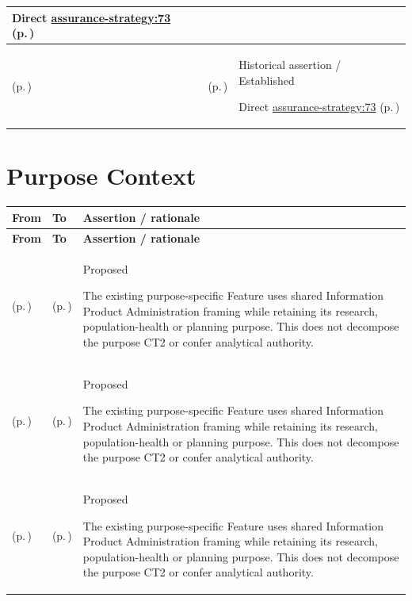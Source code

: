 \begin{longtable}{|>{\raggedright\arraybackslash}p{0.27\TableWidth}|>{\raggedright\arraybackslash}p{0.27\TableWidth}|>{\raggedright\arraybackslash}p{0.46\TableWidth}|}
Direct \hyperref[rad:assurance-strategy:58]{assurance-strategy:73} (p.\,\pageref{rad:assurance-strategy:58})\\\hline
\nameref{cap:bec-governed-assurance} (p.\,\pageref{cap:bec-governed-assurance}) & \nameref{cap:ec-14} (p.\,\pageref{cap:ec-14}) & Historical assertion / Established

Direct \hyperref[rad:assurance-strategy:58]{assurance-strategy:73} (p.\,\pageref{rad:assurance-strategy:58})\\\hline
\end{longtable}\endgroup
\section{Purpose Context}
\begingroup\small\setlength{\TableWidth}{\dimexpr\linewidth-6\tabcolsep-4\arrayrulewidth\relax}
\begin{longtable}{|>{\raggedright\arraybackslash}p{0.27\TableWidth}|>{\raggedright\arraybackslash}p{0.27\TableWidth}|>{\raggedright\arraybackslash}p{0.46\TableWidth}|}
\hline\rowcolor{TableHead}\textbf{From} & \textbf{To} & \textbf{Assertion / rationale}\\\hline\endfirsthead
\hline\rowcolor{TableHead}\textbf{From} & \textbf{To} & \textbf{Assertion / rationale}\\\hline\endhead
\hline\endfoot
\nameref{feature:authorised-research-release-assembly} (p.\,\pageref{feature:authorised-research-release-assembly}) & \nameref{cap:bec-authorised-research-information-provision} (p.\,\pageref{cap:bec-authorised-research-information-provision}) & Proposed

The existing purpose-specific Feature uses shared Information Product Administration framing while retaining its research, population-health or planning purpose. This does not decompose the purpose CT2 or confer analytical authority.\\\hline
\nameref{feature:population-notification-obligation-tracking} (p.\,\pageref{feature:population-notification-obligation-tracking}) & \nameref{cap:bec-population-health-notification-enablement} (p.\,\pageref{cap:bec-population-health-notification-enablement}) & Proposed

The existing purpose-specific Feature uses shared Information Product Administration framing while retaining its research, population-health or planning purpose. This does not decompose the purpose CT2 or confer analytical authority.\\\hline
\nameref{feature:demand-capacity-planning-projection} (p.\,\pageref{feature:demand-capacity-planning-projection}) & \nameref{cap:bec-service-planning-information-provision} (p.\,\pageref{cap:bec-service-planning-information-provision}) & Proposed

The existing purpose-specific Feature uses shared Information Product Administration framing while retaining its research, population-health or planning purpose. This does not decompose the purpose CT2 or confer analytical authority.\\\hline
\end{longtable}\endgroup
